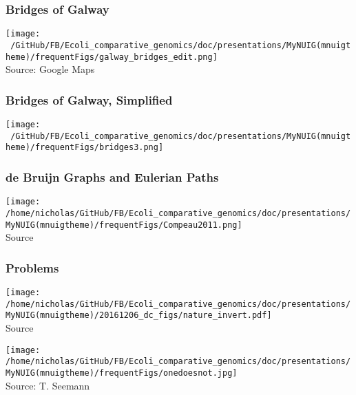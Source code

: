 \documentclass[10pt, compress]{beamer}
\begin{document}
\begin{frame}[fragile]
  \frametitle{Bridges of Galway}
  \centering
  \texttt{[image: ~/GitHub/FB/Ecoli\_comparative\_genomics/doc/presentations/MyNUIG(mnuigtheme)/frequentFigs/galway\_bridges\_edit.png]}\\\tiny {Source: Google Maps}
\end{frame}

\begin{frame}[fragile]
  \frametitle{Bridges of Galway, Simplified}
  \centering
  \hspace*{3cm}
  \texttt{[image: ~/GitHub/FB/Ecoli\_comparative\_genomics/doc/presentations/MyNUIG(mnuigtheme)/frequentFigs/bridges3.png]}
\end{frame}

\begin{frame}[fragile]
  \frametitle{de Bruijn Graphs and Eulerian Paths}
  \centering
  \texttt{[image: /home/nicholas/GitHub/FB/Ecoli\_comparative\_genomics/doc/presentations/MyNUIG(mnuigtheme)/frequentFigs/Compeau2011.png]}\\\tiny {Source\cite{Compeau2011}}
\end{frame}


\begin{frame}[fragile]
  \frametitle{Problems}
  \centering
  \texttt{[image: /home/nicholas/GitHub/FB/Ecoli\_comparative\_genomics/doc/presentations/MyNUIG(mnuigtheme)/20161206\_dc\_figs/nature\_invert.pdf]}\\\tiny {Source\cite{Chaisson2015}}
\end{frame}


\begin{frame}[fragile]
  \centering
  \texttt{[image: /home/nicholas/GitHub/FB/Ecoli\_comparative\_genomics/doc/presentations/MyNUIG(mnuigtheme)/frequentFigs/onedoesnot.jpg]}\\\tiny {Source: T. Seemann}
\end{frame}
\end{document}
